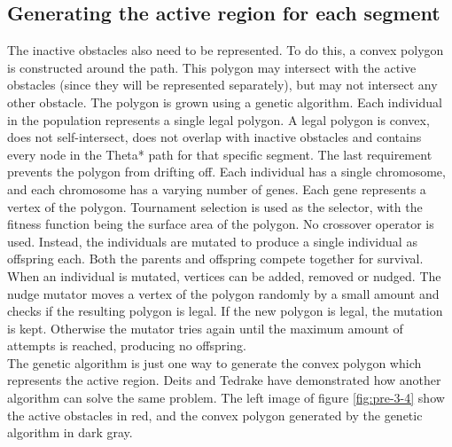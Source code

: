 \subsection{Generating the active region for each segment}
The inactive obstacles also need to be represented. To do this, a convex polygon is constructed around the path. This polygon may intersect with the active obstacles (since they will be represented separately), but may not intersect any other obstacle. The polygon is grown using a genetic algorithm. Each individual in the population represents a single legal polygon. A legal polygon is convex, does not self-intersect, does not overlap with inactive obstacles and contains every node in the Theta* path for that specific segment. The last requirement prevents the polygon from drifting off. Each individual has a single chromosome, and each chromosome has a varying number of genes. Each gene represents a vertex of the polygon. Tournament selection is used as the selector, with the fitness function being the surface area of the polygon. No crossover operator is used. Instead, the individuals are mutated to produce a single individual as offspring each. Both the parents and offspring compete together for survival. \\
When an individual is mutated, vertices can be added, removed or nudged. The nudge mutator moves a vertex of the polygon randomly by a small amount and checks if the resulting polygon is legal. If the new polygon is legal, the mutation is kept. Otherwise the mutator tries again until the maximum amount of attempts is reached, producing no offspring. \\
The genetic algorithm is just one way to generate the convex polygon which represents the active region. Deits and Tedrake \cite{Deits2015} have demonstrated how another algorithm can solve the same problem. The left image of figure \ref{fig:pre-3-4} show the active obstacles in red, and the convex polygon generated by the genetic algorithm in dark gray.

